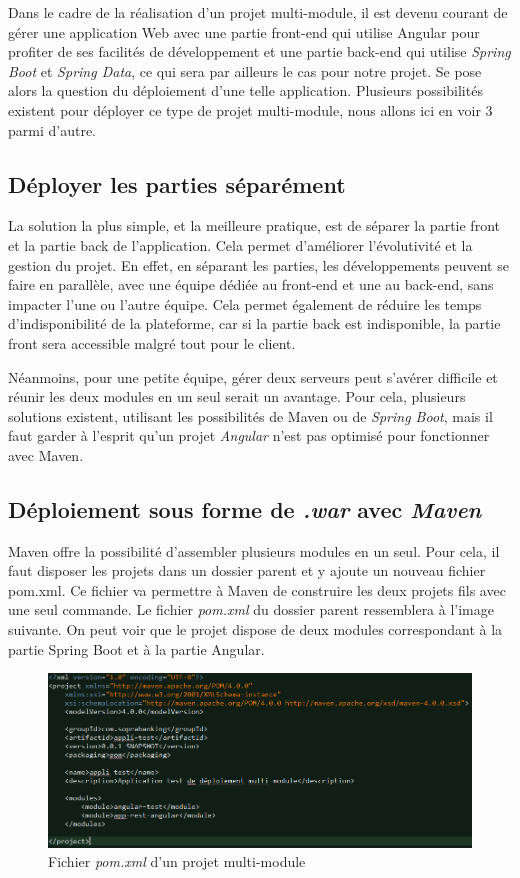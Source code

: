 \documentclass{polytech/polytech}
\begin{document}
Dans le cadre de la réalisation d’un projet multi-module, il est devenu courant de gérer une application Web avec une partie front-end qui utilise Angular pour profiter de ses facilités de développement et une partie back-end qui utilise \textit{Spring Boot} et \textit{Spring Data}, ce qui sera par ailleurs le cas pour notre projet. Se pose alors la question du déploiement d’une telle application. Plusieurs possibilités existent pour déployer ce type de projet multi-module, nous allons ici en voir 3 parmi d’autre.

\subsection{Déployer les parties séparément}

La solution la plus simple, et la meilleure pratique, est de séparer la partie front et la partie back de l’application. Cela permet d’améliorer l’évolutivité et la gestion du projet. En effet, en séparant les parties, les développements peuvent se faire en parallèle, avec une équipe dédiée au front-end et une au back-end, sans impacter l’une ou l’autre équipe. Cela permet également de réduire les temps d’indisponibilité de la plateforme, car si la partie back est indisponible, la partie front sera accessible malgré tout pour le client.

Néanmoins, pour une petite équipe, gérer deux serveurs peut s’avérer difficile et réunir les deux modules en un seul serait un avantage. Pour cela, plusieurs solutions existent, utilisant les possibilités de Maven ou de \textit{Spring Boot}, mais il faut garder à l’esprit qu’un projet \textit{Angular} n’est pas optimisé pour fonctionner avec Maven. 

\subsection{Déploiement sous forme de \textit{.war} avec \textit{Maven}}

Maven offre la possibilité d’assembler plusieurs modules en un seul. Pour cela, il faut disposer les projets dans un dossier parent et y ajoute un nouveau fichier pom.xml. Ce fichier va permettre à Maven de construire les deux projets fils avec une seul commande. Le fichier \textit{pom.xml} du dossier parent ressemblera à l’image suivante. On peut voir que le projet dispose de deux modules correspondant à la partie Spring Boot et à la partie Angular. 

\begin{figure}
	\includegraphics[scale=0.6]{images/pomParent}
	\caption{Fichier \textit{pom.xml} d'un projet multi-module}
	\label{fig:pomMultiApp}
\end{figure}
\end{document}
